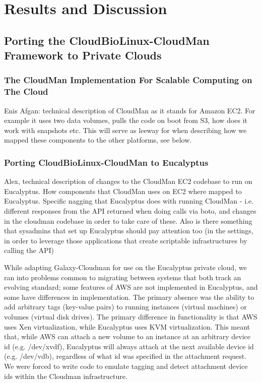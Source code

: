\documentclass[10pt]{bmc_article}
\newenvironment{bmcformat}{\baselineskip20pt\sloppy\setboolean{publ}{false}}{\baselineskip20pt\sloppy}
\begin{document}
\begin{bmcformat}
\section*{Results and Discussion}


\subsection*{Porting the CloudBioLinux-CloudMan Framework to Private Clouds} 

\subsubsection*{The CloudMan Implementation For Scalable Computing on The Cloud}

Enis Afgan: technical description of CloudMan as it stands for Amazon EC2. For example it uses two data volumes,
pulls the code on boot from S3, how does it work with snapshots etc. This will serve as leeway for when describing
how we mapped these components to the other platforms, see below. \pb

\subsubsection*{Porting CloudBioLinux-CloudMan to Eucalyptus}
Alex, technical description of changes to the CloudMan EC2 codebase to run on Eucalyptus. How components that
CloudMan uses on EC2 where mapped to Eucalyptus. Specific nagging that Eucalyptus does with running CloudMan -
i.e. different responses from the API returned when doing calls via boto, and changes in the cloudman codebase in
order to take care of these. Also is there something that sysadmins that set up Eucalyptus should pay attention too 
(in the settings, in order to leverage those applications that create scriptable infrastructures by calling the API) \pb

While adapting Galaxy-Cloudman for use on the Eucalyptus private cloud, we ran into problems common to migrating 
between systems that both track an evolving standard; some features of AWS are not implemented in Eucalyptus, and some 
have differences in implementation. The primary absence was the ability to add arbitrary tags (key-value pairs) to running instances 
(virtual machines) or volumes (virtual disk drives). The primary difference in functionality is that AWS uses Xen virtualization, 
while Eucalyptus uses KVM virtualization. This meant that, while AWS can attach a new volume to an instance at an arbitrary device 
id (e.g. /dev/xvdf), Eucalyptus will always attach at the next available device id (e.g. /dev/vdb), regardless of what id was specified 
in the attachment request. We were forced to write code to emulate tagging and detect attachment device ids within the Cloudman 
infrastructure. 


\end{bmcformat}
\end{document}
